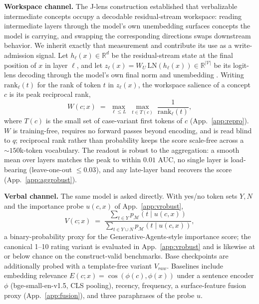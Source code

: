 \textbf{Workspace channel.}
The J-lens construction \citep{anthropic2026workspace} established that
verbalizable intermediate concepts occupy a decodable residual-stream
workspace: reading intermediate layers through the model's own unembedding
surfaces concepts the model is carrying, and swapping the corresponding
directions swaps downstream behavior. We inherit exactly that measurement
and contribute its use as a write-admission signal. Let
$h_\ell(x)\in\mathbb{R}^{d}$ be the residual-stream state at the final position
of $x$ in layer $\ell$, and let
$z_\ell(x) = W_U\,\mathrm{LN}\!\left(h_\ell(x)\right) \in
\mathbb{R}^{|\mathcal{V}|}$ be its logit-lens decoding through the model's own
final norm and unembedding \citep{nostalgebraist2020logitlens}. Writing
$\mathrm{rank}_\ell(t)$ for the rank of token $t$ in $z_\ell(x)$, the workspace
salience of a concept $c$ is its peak reciprocal rank,
\begin{equation}
W(c; x) \;=\; \max_{\ell \le L} \;\max_{t \in T(c)}\;
\frac{1}{\mathrm{rank}_\ell(t)},
\label{eq:wrr}
\end{equation}
where $T(c)$ is the small set of case-variant first tokens of $c$
(App.~\ref{app:repro}). $W$ is training-free, requires no forward passes beyond
encoding, and is read blind to $q$; reciprocal rank rather than probability
keeps the score scale-free across a ${\sim}150$k-token vocabulary. The readout
is robust to the aggregation: a smooth mean over layers matches the peak to
within $0.01$ AUC, no single layer is load-bearing (leave-one-out ${\le}0.03$),
and any late-layer band recovers the score (App.~\ref{app:aggrobust}).

\textbf{Verbal channel.}
The same model is asked directly. With yes/no token sets $Y, N$ and the
importance probe $u(c, x)$ of App.~\ref{app:vrobust},
\begin{equation}
V(c; x) \;=\;
\frac{\sum_{t\in Y} p_{\mathcal{M}}\!\left(t \mid u(c,x)\right)}
     {\sum_{t\in Y\cup N} p_{\mathcal{M}}\!\left(t \mid u(c,x)\right)},
\label{eq:v}
\end{equation}
a binary-probability proxy for the Generative-Agents-style importance score;
the canonical 1--10 rating variant is evaluated in App.~\ref{app:vrobust} and
is likewise at or below chance on the construct-valid benchmarks. Base
checkpoints are additionally probed with a template-free variant $V_{raw}$.
Baselines include embedding relevance $E(c;x)=\cos(\phi(c),\phi(x))$ under a
sentence encoder $\phi$ (bge-small-en-v1.5, CLS pooling), recency, frequency, a surface-feature fusion proxy
(App.~\ref{app:fusion}), and three paraphrases of the probe $u$.

